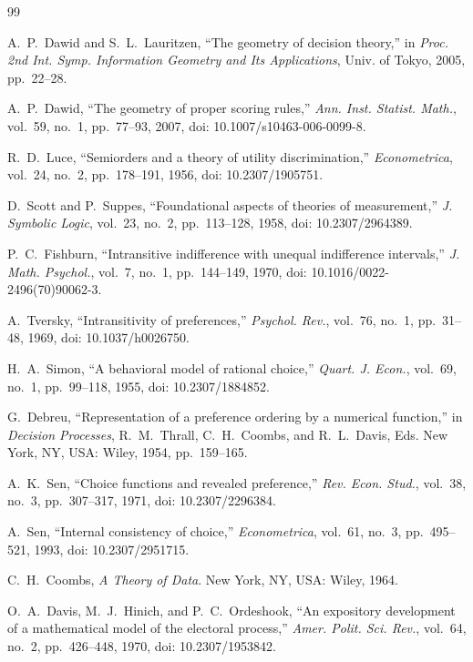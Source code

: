 \documentclass[11pt]{article}
\theoremstyle{definition}
\theoremstyle{remark}
\begin{document}
\begin{thebibliography}{99}

A.~P.~Dawid and S.~L.~Lauritzen, ``The geometry of decision theory,'' in \emph{Proc. 2nd Int. Symp. Information Geometry and Its Applications}, Univ. of Tokyo, 2005, pp.~22--28.

A.~P.~Dawid, ``The geometry of proper scoring rules,'' \emph{Ann. Inst. Statist. Math.}, vol.~59, no.~1, pp.~77--93, 2007, doi: 10.1007/s10463-006-0099-8.

R.~D.~Luce, ``Semiorders and a theory of utility discrimination,'' \emph{Econometrica}, vol.~24, no.~2, pp.~178--191, 1956, doi: 10.2307/1905751.

D.~Scott and P.~Suppes, ``Foundational aspects of theories of measurement,'' \emph{J. Symbolic Logic}, vol.~23, no.~2, pp.~113--128, 1958, doi: 10.2307/2964389.

P.~C.~Fishburn, ``Intransitive indifference with unequal indifference intervals,'' \emph{J. Math. Psychol.}, vol.~7, no.~1, pp.~144--149, 1970, doi: 10.1016/0022-2496(70)90062-3.

A.~Tversky, ``Intransitivity of preferences,'' \emph{Psychol. Rev.}, vol.~76, no.~1, pp.~31--48, 1969, doi: 10.1037/h0026750.

H.~A.~Simon, ``A behavioral model of rational choice,'' \emph{Quart. J. Econ.}, vol.~69, no.~1, pp.~99--118, 1955, doi: 10.2307/1884852.

G.~Debreu, ``Representation of a preference ordering by a numerical function,'' in \emph{Decision Processes}, R.~M.~Thrall, C.~H.~Coombs, and R.~L.~Davis, Eds. New York, NY, USA: Wiley, 1954, pp.~159--165.

A.~K.~Sen, ``Choice functions and revealed preference,'' \emph{Rev. Econ. Stud.}, vol.~38, no.~3, pp.~307--317, 1971, doi: 10.2307/2296384.

A.~Sen, ``Internal consistency of choice,'' \emph{Econometrica}, vol.~61, no.~3, pp.~495--521, 1993, doi: 10.2307/2951715.

C.~H.~Coombs, \emph{A Theory of Data}. New York, NY, USA: Wiley, 1964.

O.~A.~Davis, M.~J.~Hinich, and P.~C.~Ordeshook, ``An expository development of a mathematical model of the electoral process,'' \emph{Amer. Polit. Sci. Rev.}, vol.~64, no.~2, pp.~426--448, 1970, doi: 10.2307/1953842.


\end{thebibliography}
\end{document}

